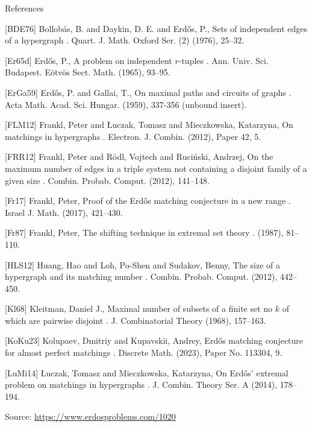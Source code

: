 \documentclass{article}
\begin{document}
References

[BDE76] Bollob\'{a}s, B. and Daykin, D. E. and Erd\H{o}s, P., Sets of independent edges of a hypergraph . Quart. J. Math. Oxford Ser. (2) (1976), 25--32.

[Er65d] Erd\H{o}s, P., A problem on independent {$r$}-tuples . Ann. Univ. Sci. Budapest. E\"otv\"os Sect. Math. (1965), 93--95.

[ErGa59] Erd\H{o}s, P. and Gallai, T., On maximal paths and circuits of graphs . Acta Math. Acad. Sci. Hungar. (1959), 337-356 (unbound insert).

[FLM12] Frankl, Peter and \L uczak, Tomasz and Mieczkowska, Katarzyna, On matchings in hypergraphs . Electron. J. Combin. (2012), Paper 42, 5.

[FRR12] Frankl, Peter and R\"odl, Vojtech and Ruci\'nski, Andrzej, On the maximum number of edges in a triple system not containing a disjoint family of a given size . Combin. Probab. Comput. (2012), 141--148.

[Fr17] Frankl, Peter, Proof of the {E}rd\H{o}s matching conjecture in a new range . Israel J. Math. (2017), 421--430.

[Fr87] Frankl, Peter, The shifting technique in extremal set theory . (1987), 81--110.

[HLS12] Huang, Hao and Loh, Po-Shen and Sudakov, Benny, The size of a hypergraph and its matching number . Combin. Probab. Comput. (2012), 442--450.

[Kl68] Kleitman, Daniel J., Maximal number of subsets of a finite set no {$k$} of which are pairwise disjoint . J. Combinatorial Theory (1968), 157--163.

[KoKu23] Kolupaev, Dmitriy and Kupavskii, Andrey, Erd\H{o}s matching conjecture for almost perfect matchings . Discrete Math. (2023), Paper No. 113304, 9.

[LuMi14] \L uczak, Tomasz and Mieczkowska, Katarzyna, On {E}rd\H{o}s' extremal problem on matchings in hypergraphs . J. Combin. Theory Ser. A (2014), 178--194.

\bigskip
\noindent\small{Source: \url{https://www.erdosproblems.com/1020}}
\end{document}
